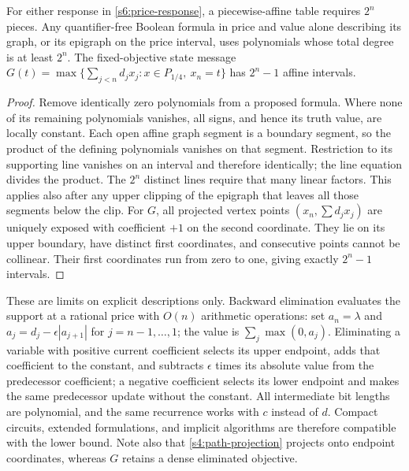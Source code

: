 \begin{corollary}\label{s6:response-size}
For either response in \cref{s6:price-response}, a piecewise-affine table
requires $2^n$ pieces. Any quantifier-free Boolean formula in price and
value alone describing its graph, or its epigraph on the price interval,
uses polynomials whose total degree is at least $2^n$.
The fixed-objective state message
$G(t)=\max\{\sum_{j<n}d_jx_j:x\in P_{1/4},\ x_n=t\}$ has
$2^n-1$ affine intervals.
\end{corollary}
\begin{proof}
Remove identically zero polynomials from a proposed formula. Where none
of its remaining polynomials vanishes, all signs, and hence its truth
value, are locally constant. Each open affine graph segment is a
boundary segment, so the product of the defining polynomials vanishes
on that segment. Restriction to its supporting line vanishes on an
interval and therefore identically; the line equation divides the
product. The $2^n$ distinct lines require that many linear factors.
This applies also after any upper clipping of the epigraph that leaves
all those segments below the clip.
For $G$, all projected vertex points $(x_n,\sum d_jx_j)$ are uniquely
exposed with coefficient $+1$ on the second coordinate. They lie on its
upper boundary, have distinct first coordinates, and consecutive points
cannot be collinear. Their first coordinates run from zero to one,
giving exactly $2^n-1$ intervals.
\end{proof}

These are limits on explicit descriptions only. Backward elimination
evaluates the support at a rational price with $O(n)$ arithmetic operations:
set $a_n=\lambda$ and $a_j=d_j-\epsilon|a_{j+1}|$ for $j=n-1,\ldots,1$;
the value is $\sum_j\max(0,a_j)$. Eliminating a variable with positive
current coefficient selects its upper endpoint, adds that coefficient
to the constant, and subtracts $\epsilon$ times its absolute value from
the predecessor coefficient; a negative coefficient selects its lower
endpoint and makes the same predecessor update without the constant.
All intermediate bit lengths are polynomial, and the same recurrence works
with $c$ instead of $d$. Compact circuits, extended formulations, and
implicit algorithms are therefore compatible with the lower bound.
Note also that \cref{s4:path-projection} projects onto endpoint coordinates,
whereas $G$ retains a dense eliminated objective.

